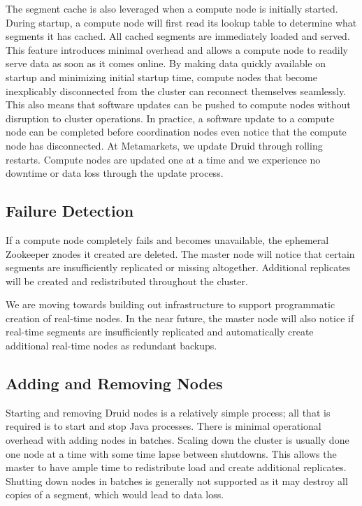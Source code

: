 \documentclass{vldb}
\begin{document}
The segment cache is also leveraged when a compute node is initially
started. During startup, a compute node will first read its lookup
table to determine what segments it has cached. All cached segments
are immediately loaded and served. This feature introduces minimal
overhead and allows a compute node to readily serve data as soon as it
comes online. By making data quickly available on startup and
minimizing initial startup time, compute nodes that become
inexplicably disconnected from the cluster can reconnect themselves
seamlessly. This also means that software updates can be pushed to
compute nodes without disruption to cluster operations. In practice, a
software update to a compute node can be completed before coordination
nodes even notice that the compute node has disconnected. At
Metamarkets, we update Druid through rolling restarts. Compute nodes
are updated one at a time and we experience no downtime or data loss
through the update process.

\subsection{Failure Detection}
If a compute node completely fails and becomes unavailable, the
ephemeral Zookeeper znodes it created are deleted. The master node
will notice that certain segments are insufficiently replicated or
missing altogether. Additional replicates will be created and
redistributed throughout the cluster.

We are moving towards building out infrastructure to support
programmatic creation of real-time nodes. In the near future, the
master node will also notice if real-time segments are insufficiently
replicated and automatically create additional real-time nodes as
redundant backups.

\subsection{Adding and Removing Nodes}
Starting and removing Druid nodes is a relatively simple process; all
that is required is to start and stop Java processes. There is minimal
operational overhead with adding nodes in batches. Scaling down the
cluster is usually done one node at a time with some time lapse
between shutdowns. This allows the master to have ample time to
redistribute load and create additional replicates. Shutting down
nodes in batches is generally not supported as it may destroy all
copies of a segment, which would lead to data loss.
\end{document}
